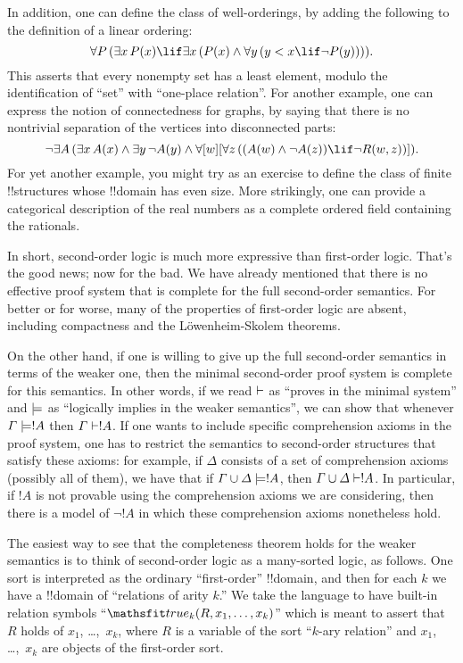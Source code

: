 \documentclass[../../include/open-logic-section]{subfiles}
\begin{document}
In addition, one can define the class of well-orderings, by adding the
following to the definition of a linear ordering:
\[
\lforall[P][(\lexists[x][\Atom{P}{x}] \lif \lexists[x][(\Atom{P}{x}
    \land \lforall[y][(y < x \lif \lnot \Atom{P}{y})])])].
\]
This asserts that every nonempty set has a least element, modulo the
identification of ``set'' with ``one-place relation''. For another
example, one can express the notion of connectedness for graphs, by
saying that there is no nontrivial separation of the vertices into
disconnected parts:
\[
\lnot \lexists[A][(\lexists[x][A(x)] \land \lexists[y][\lnot A(y)]
  \land \forall[w][\lforall[z][((\Atom{A}{w} \land \lnot \Atom{A}{z})
      \lif \lnot \Atom{R}{w,z})]])].
\]
For yet another example, you might try as an exercise to define the
class of finite !!{structure}s whose !!{domain} has even size. More
strikingly, one can provide a categorical description of the real
numbers as a complete ordered field containing the rationals.

In short, second-order logic is much more expressive than first-order
logic. That's the good news; now for the bad. We have already
mentioned that there is no effective proof system that is complete for
the full second-order semantics. For better or for worse, many of the
properties of first-order logic are absent, including compactness and
the L\"owenheim-Skolem theorems.

On the other hand, if one is willing to give up the full second-order
semantics in terms of the weaker one, then the minimal second-order
proof system is complete for this semantics. In other words, if we
read $\Proves$ as ``proves in the minimal system'' and $\Entails$ as
``logically implies in the weaker semantics'', we can show that
whenever $\Gamma \Entails !A$ then $\Gamma \Proves !A$. If one wants
to include specific comprehension axioms in the proof system, one has
to restrict the semantics to second-order structures that satisfy
these axioms: for example, if $\Delta$ consists of a set of
comprehension axioms (possibly all of them), we have that if $\Gamma
\cup \Delta \Entails !A$, then $\Gamma \cup \Delta \Proves !A$. In
particular, if $!A$ is not provable using the comprehension axioms we
are considering, then there is a model of $\lnot !A$ in which these
comprehension axioms nonetheless hold.

The easiest way to see that the completeness theorem holds for the
weaker semantics is to think of second-order logic as a many-sorted
logic, as follows. One sort is interpreted as the ordinary
``first-order'' !!{domain}, and then for each $k$ we have a !!{domain}
of ``relations of arity $k$.'' We take the language to have built-in
relation symbols ``$\Atom{\Obj{true}_k}{R,x_1,\dots,x_k}$'' which is
meant to assert that $R$ holds of $x_1$, \dots,~$x_k$, where $R$ is a
variable of the sort ``$k$-ary relation'' and $x_1$, \dots,~$x_k$ are
objects of the first-order sort.
\end{document}
